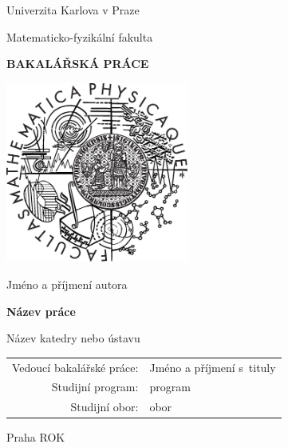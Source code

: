 
\pagestyle{empty}
\begin{center}

\large

Univerzita Karlova v Praze

\medskip

Matematicko-fyzikální fakulta

\vfill

{\bf\Large BAKALÁŘSKÁ PRÁCE}

\vfill

\centerline{\mbox{\includegraphics[width=60mm]{img/logo.eps}}}

\vfill
\vspace{5mm}

{\LARGE Jméno a příjmení autora} %

\vspace{15mm}

{\LARGE\bfseries Název práce} %

\vfill

Název katedry nebo ústavu %

\vfill

\begin{tabular}{rl}

Vedoucí bakalářské práce: & Jméno a příjmení s~tituly \\ %
\noalign{\vspace{2mm}}
Studijní program: & program \\ %
\noalign{\vspace{2mm}}
Studijní obor: & obor \\ %
\end{tabular}

\vfill

Praha ROK %

\end{center}
